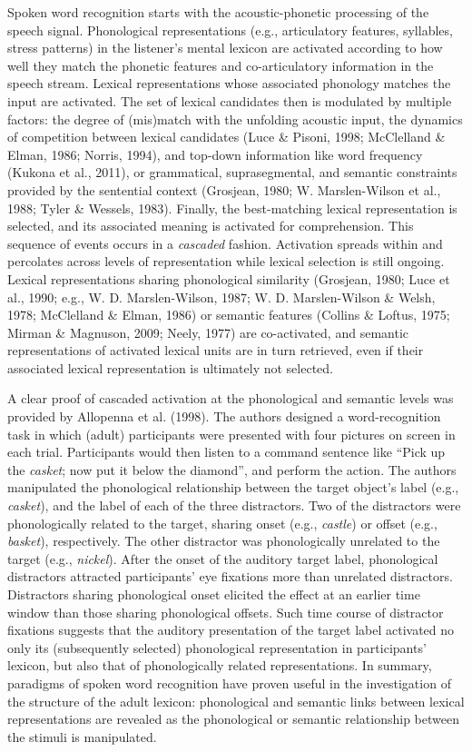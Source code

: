 \documentclass[
  12pt,
  b5paperpaper,
  twoside]{scrreprt}
\begin{document}
Spoken word recognition starts with the acoustic-phonetic processing of
the speech signal. Phonological representations (e.g., articulatory
features, syllables, stress patterns) in the listener's mental lexicon
are activated according to how well they match the phonetic features and
co-articulatory information in the speech stream. Lexical
representations whose associated phonology matches the input are
activated. The set of lexical candidates then is modulated by multiple
factors: the degree of (mis)match with the unfolding acoustic input, the
dynamics of competition between lexical candidates (Luce \& Pisoni,
1998; McClelland \& Elman, 1986; Norris, 1994), and top-down information
like word frequency (Kukona et al., 2011), or grammatical,
suprasegmental, and semantic constraints provided by the sentential
context (Grosjean, 1980; W. Marslen-Wilson et al., 1988; Tyler \&
Wessels, 1983). Finally, the best-matching lexical representation is
selected, and its associated meaning is activated for comprehension.
This sequence of events occurs in a \emph{cascaded} fashion. Activation
spreads within and percolates across levels of representation while
lexical selection is still ongoing. Lexical representations sharing
phonological similarity (Grosjean, 1980; Luce et al., 1990; e.g., W. D.
Marslen-Wilson, 1987; W. D. Marslen-Wilson \& Welsh, 1978; McClelland \&
Elman, 1986) or semantic features (Collins \& Loftus, 1975; Mirman \&
Magnuson, 2009; Neely, 1977) are co-activated, and semantic
representations of activated lexical units are in turn retrieved, even
if their associated lexical representation is ultimately not selected.

A clear proof of cascaded activation at the phonological and semantic
levels was provided by Allopenna et al. (1998). The authors designed a
word-recognition task in which (adult) participants were presented with
four pictures on screen in each trial. Participants would then listen to
a command sentence like ``Pick up the \emph{casket}; now put it below
the diamond'', and perform the action. The authors manipulated the
phonological relationship between the target object's label (e.g.,
\emph{casket}), and the label of each of the three distractors. Two of
the distractors were phonologically related to the target, sharing onset
(e.g., \emph{castle}) or offset (e.g., \emph{basket}), respectively. The
other distractor was phonologically unrelated to the target (e.g.,
\emph{nickel}). After the onset of the auditory target label,
phonological distractors attracted participants' eye fixations more than
unrelated distractors. Distractors sharing phonological onset elicited
the effect at an earlier time window than those sharing phonological
offsets. Such time course of distractor fixations suggests that the
auditory presentation of the target label activated no only its
(subsequently selected) phonological representation in participants'
lexicon, but also that of phonologically related representations. In
summary, paradigms of spoken word recognition have proven useful in the
investigation of the structure of the adult lexicon: phonological and
semantic links between lexical representations are revealed as the
phonological or semantic relationship between the stimuli is
manipulated.
\end{document}
